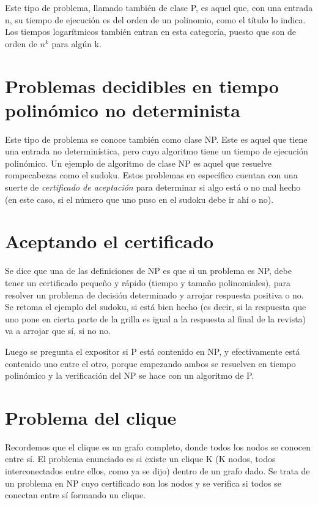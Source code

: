 \documentclass[a4paper]{article}
\begin{document}
Este tipo de problema, llamado también de clase P, es aquel que, con una entrada n, su tiempo de ejecución es del orden de un polinomio, como el título lo indica. Los tiempos logarítmicos también entran en esta categoría, puesto que son de orden de \(n^k\) para algún k. 

\section{Problemas decidibles en tiempo polinómico no determinista}

Este tipo de problema se conoce también como clase NP. Este es aquel que tiene una entrada no determinística, pero cuyo algoritmo tiene un tiempo de ejecución polinómico. Un ejemplo de algoritmo de clase NP es aquel que resuelve rompecabezas como el sudoku. Estos problemas en específico cuentan con una suerte de \textit{certificado de aceptación} para determinar si algo está o no mal hecho (en este caso, si el número que uno puso en el sudoku debe ir ahí o no). 

\section{Aceptando el certificado}

Se dice que una de las definiciones de NP es que si un problema es NP, debe tener un certificado pequeño y rápido (tiempo y tamaño polinomiales), para resolver un problema de decisión determinado y arrojar respuesta positiva o no. Se retoma el ejemplo del sudoku, si está bien hecho (es decir, si la respuesta que uno pone en cierta parte de la grilla es igual a la respuesta al final de la revista) va a arrojar que sí, si no no. 

Luego se pregunta el expositor si P está contenido en NP, y efectivamente está contenido uno entre el otro, porque empezando ambos se resuelven en tiempo polinómico y la verificación del NP se hace con un algoritmo de P. 


\section{Problema del clique}

Recordemos que el clique es un grafo completo, donde todos los nodos se conocen entre sí. El problema enunciado es si existe un clique K (K nodos, todos interconectados entre ellos, como ya se dijo) dentro de un grafo dado. Se trata de un problema en NP cuyo certificado son los nodos y se verifica si todos se conectan entre sí formando un clique. 
\end{document}
